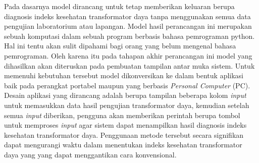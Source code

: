Pada dasarnya model dirancang untuk tetap memberikan keluaran berupa diagnosis indeks kesehatan transformator daya tanpa menggunakan semua data pengujian laboratorium atau lapangan. Model hasil perancangan ini merupakan sebuah komputasi dalam sebuah program berbasis bahasa pemrograman python. Hal ini tentu akan sulit dipahami bagi orang yang belum mengenal bahasa pemrograman. Oleh karena itu pada tahapan akhir perancangan ini model yang dihasilkan akan diteruskan pada pembuatan tampilan antar muka sistem. Untuk memenuhi kebutuhan tersebut model dikonversikan ke dalam bentuk aplikasi baik pada perangkat portabel maupun yang berbasis \textit{Personal Computer} (PC). Desain aplikasi yang dirancang adalah berupa tampilan beberapa kolom \textit{input} untuk memasukkan data hasil pengujian transformator daya, kemudian setelah semua \textit{input} diberikan, pengguna akan memberikan perintah berupa tombol untuk memproses \textit{input} agar sistem dapat menampilkan hasil diagnosis indeks kesehatan transformator daya. Penggunaan metode tersebut secara signifikan dapat mengurangi waktu dalam menentukan indeks kesehatan transformator daya yang yang dapat menggantikan cara konvensional. \par






%
%








